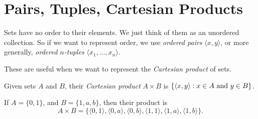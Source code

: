 \documentclass[open-logic-section]{subfiles}
\begin{document}
\section{Pairs, Tuples, Cartesian Products}

\begin{wordy}
Sets have no order to their elements. We just think of them as an
unordered collection. So if we want to represent order, we use
\emph{ordered pairs} $\langle x, y \rangle$, or more generally,
\emph{ordered $n$-tuples} $\langle x_1, ..., x_n \rangle$.

These are useful when we want to represent the \emph{Cartesian
  product} of sets.
\end{wordy}

\begin{defn} 
Given sets $A$ and $B$, their \emph{Cartesian product} $A \times B$ is
$\{ \langle x, y \rangle : x \in A \mbox{ and } y \in B \}$.
\end{defn}

\begin{ex}
If $A = \{0, 1\}$, and $B = \{1, a, b\}$, then their product is
\[
A \times B = \{ \langle 0, 1 \rangle, \langle 0, a \rangle, \langle 0, b
    \rangle, \langle 1, 1 \rangle, \langle 1, a \rangle, \langle 1, b
    \rangle \}.
\]
\end{ex}
\end{document}
